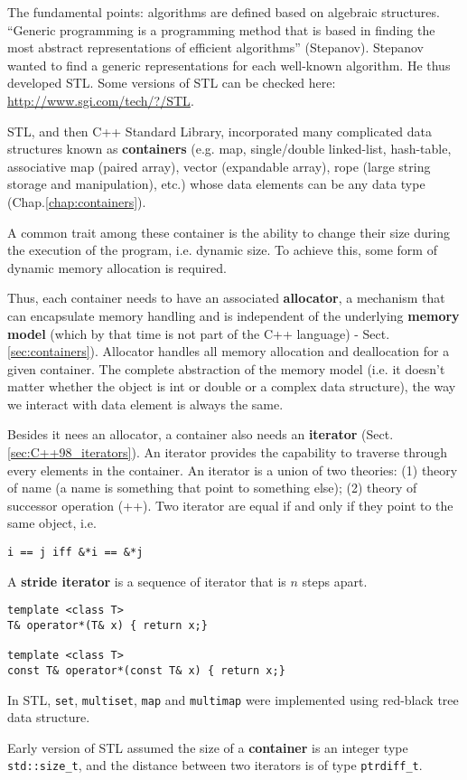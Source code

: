 % 
\begin{mdframed}

The fundamental points: algorithms are defined based on algebraic structures.
``Generic programming is a programming method that is based in finding the most
abstract representations of efficient algorithms'' (Stepanov). Stepanov wanted
to find a generic representations for each well-known algorithm. He thus
developed STL. Some versions of
STL can be checked here: \url{http://www.sgi.com/tech/?/STL}.

STL, and then C++ Standard Library, incorporated many complicated data
structures known as {\bf containers} (e.g. map, single/double linked-list,
hash-table,  associative map (paired array), vector (expandable array), rope
(large string storage and manipulation), etc.) whose data elements can be any
data type (Chap.\ref{chap:containers}). 

A common trait among these container is the ability to change their size during
the execution of the program, i.e. dynamic size. To achieve this, some form of
dynamic memory allocation is required. 

Thus, each container needs to have an associated  {\bf allocator}, a mechanism
that can encapsulate memory handling and is independent of the underlying {\bf
memory model} (which by that time is not part of the C++ language) - Sect.\ref{sec:containers}).
Allocator handles all memory allocation and deallocation for a given container.
The complete abstraction of the memory model (i.e. it doesn't matter whether the
object is int or double or a complex data structure), the way we interact with
data element is always the same.
 

Besides it nees an allocator, a container also needs an {\bf iterator} (Sect.\ref{sec:C++98_iterators}).
An iterator provides the capability to traverse through every elements in the
container. An iterator is a union of two theories: (1) theory of name (a name is
something that point to something else); (2) theory of successor operation (++).
Two iterator are equal if and only if they point to the same object, i.e.
\begin{verbatim}
i == j iff &*i == &*j
\end{verbatim}
A {\bf stride iterator} is a sequence of iterator that is $n$ steps apart.
\begin{verbatim}
template <class T>
T& operator*(T& x) { return x;}

template <class T>
const T& operator*(const T& x) { return x;}
\end{verbatim}
In STL, \verb!set!, \verb!multiset!, \verb!map! and \verb!multimap! were
implemented using red-black tree data structure.

Early version of STL assumed the size of a {\bf container} is an integer type
\verb!std::size_t!, and the distance between two iterators is of type
\verb!ptrdiff_t!. 

\end{mdframed}


